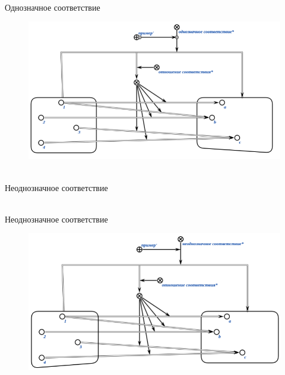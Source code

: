 \begin{frame}{\\Однозначное соответствие}
    \topline
    \begin{center}
        \begin{figure}[Hb]
            \centering
            \includegraphics[scale=.72]{figures/sd_correspondences/One-to-one correspondence.png}
        \end{figure}
    \end{center}
\end{frame}

\begin{frame}{\\Неоднозначное соответствие}
\topline
\begin{SCn}
\end{SCn}
\end{frame}

\begin{frame}{\\Неоднозначное соответствие}
    \topline
    \begin{center}
        \begin{figure}[Hb]
            \centering
            \includegraphics[scale=.72]{figures/sd_correspondences/Ambiguous correspondence.png}
        \end{figure}
    \end{center}
\end{frame}

